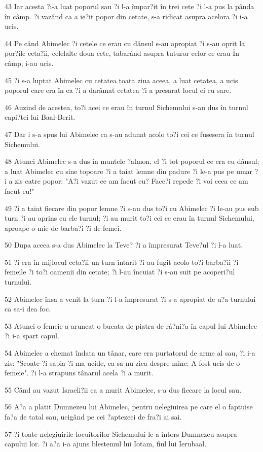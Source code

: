 \par 43 Iar acesta ?i-a luat poporul sau ?i l-a împar?it în trei cete ?i l-a pus la pânda în câmp. ?i vazând ca a ie?it popor din cetate, s-a ridicat asupra acelora ?i i-a ucis.
\par 44 Pe când Abimelec ?i cetele ce erau cu dânsul s-au apropiat ?i s-au oprit la por?ile ceta?ii, celelalte doua cete, tabarând asupra tuturor celor ce erau În câmp, i-au ucis.
\par 45 ?i s-a luptat Abimelec cu cetatea toata ziua aceea, a luat cetatea, a ucis poporul care era în ea ?i a darâmat cetatea ?i a presarat locul ei cu sare.
\par 46 Auzind de acestea, to?i acei ce erau în turnul Sichemului s-au dus în turnul capi?tei lui Baal-Berit.
\par 47 Dar i s-a spus lui Abimelec ca s-au adunat acolo to?i cei ce fusesera în turnul Sichemului.
\par 48 Atunci Abimelec s-a dus în muntele ?almon, el ?i tot poporul ce era eu dânsul; a luat Abimelec cu sine topoare ?i a taiat lemne din padure ?i le-a pus pe umar ?i a zis catre popor: "A?i vazut ce am facut eu? Face?i repede ?i voi ceea ce am facut eu!"
\par 49 ?i a taiat fiecare din popor lemne ?i s-au dus to?i cu Abimelec ?i le-au pus sub turn ?i au aprins cu ele turnul; ?i au murit to?i cei ce erau în turnul Sichemului, aproape o mie de barba?i ?i de femei.
\par 50 Dupa aceea s-a dus Abimelec la Teve? ?i a împresurat Teve?ul ?i l-a luat.
\par 51 ?i era în mijlocul ceta?ii un turn întarit ?i au fugit acolo to?i barba?ii ?i femeile ?i to?i oamenii din cetate; ?i l-au încuiat ?i s-au suit pe acoperi?ul turnului.
\par 52 Abimelec însa a venit la turn ?i l-a împresurat ?i s-a apropiat de u?a turnului ca sa-i dea foc.
\par 53 Atunci o femeie a aruncat o bucata de piatra de râ?ni?a în capul lui Abimelec ?i i-a spart capul.
\par 54 Abimelec a chemat îndata un tânar, care era purtatorul de arme al sau, ?i i-a zis: "Scoate-?i sabia ?i ma ucide, ca sa nu zica despre mine: A fost ucis de o femeie". ?i l-a strapuns tânarul acela ?i a murit.
\par 55 Când au vazut Israeli?ii ca a murit Abimelec, s-a dus fiecare la locul sau.
\par 56 A?a a platit Dumnezeu lui Abimelec, pentru nelegiuirea pe care el o faptuise fa?a de tatal sau, ucigând pe cei ?aptezeci de fra?i ai sai.
\par 57 ?i toate nelegiuirile locuitorilor Sichemului le-a întors Dumnezeu asupra capului lor. ?i a?a i-a ajuns blestemul lui Iotam, fiul lui Ierubaal.

